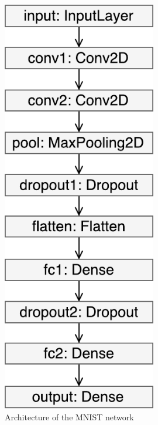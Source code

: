 \begin{figure}
    \begin{minipage}{0.5\textwidth}
        \centering
            \includegraphics[width=0.6\textwidth]{fig/mnist_keras.pdf}
            \caption{Architecture of the MNIST network}
            \label{mnist-architecture}
    \end{minipage}
    \begin{minipage}{0.4\textwidth}
        \centering

\end{minipage}
\end{figure}
